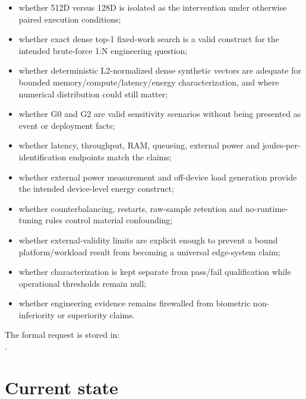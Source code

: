 \documentclass[10pt,a4paper]{article}
\begin{document}
\begin{itemize}
\item whether 512D versus 128D is isolated as the intervention under otherwise paired execution conditions;
\item whether exact dense top-1 fixed-work search is a valid construct for the intended brute-force 1:N engineering question;
\item whether deterministic L2-normalized dense synthetic vectors are adequate for bounded memory/compute/latency/energy
characterization, and where numerical distribution could still matter;
\item whether G0 and G2 are valid sensitivity scenarios without being presented as event or deployment facts;
\item whether latency, throughput, RAM, queueing, external power and joules-per-identification endpoints match the claims;
\item whether external power measurement and off-device load generation provide the intended device-level energy construct;
\item whether counterbalancing, restarts, raw-sample retention and no-runtime-tuning rules control material confounding;
\item whether external-validity limits are explicit enough to prevent a bound platform/workload result from becoming a
universal edge-system claim;
\item whether characterization is kept separate from pass/fail qualification while operational thresholds remain null;
\item whether engineering evidence remains firewalled from biometric non-inferiority or superiority claims.
\end{itemize}

The formal request is stored in:\\
.

\section{Current state}
\end{document}
